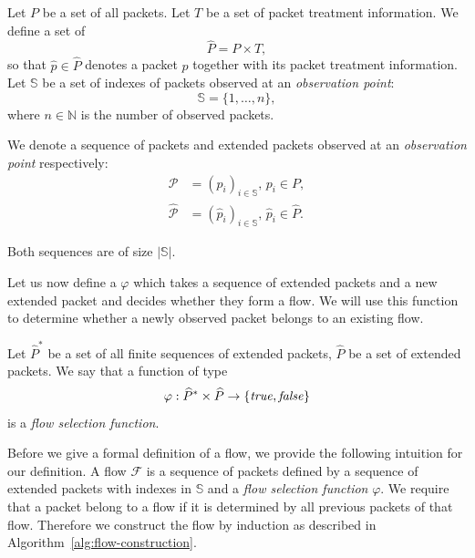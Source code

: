 \begin{defn}
Let $P$ be a set of all packets. Let $T$ be a set of packet treatment information. We define a set of 
\begin{equation*}
    \widehat{P} = P\times T,
\end{equation*}
so that $\widehat{p} \in \widehat{P}$ denotes a packet $p$ together with its packet treatment information. Let $\mathbb{S}$ be a set of indexes of packets observed at an \emph{observation point}:
\begin{equation*}
    \mathbb{S} = \{1, \ldots, n\}, %
\end{equation*}
where $n \in \mathbb{N}$ is the number of observed packets.%

We denote a sequence of packets and extended packets observed at an \emph{observation point} respectively:
\begin{align*}
    \mathcal{P} &= (p_i)_{i \in \mathbb{S}},\, p_i \in P,\\
    \widehat{\mathcal{P}} &= (\widehat{p}_i)_{i \in \mathbb{S}},\, \widehat{p}_i \in \widehat{P}.
\end{align*}
\end{defn}
Both sequences are of size $|\mathbb{S}|$. 

Let us now define a \emph{} $\varphi$ which takes a sequence of extended packets and a new extended packet and decides whether they form a flow. We will use this function to determine whether a newly observed packet belongs to an existing flow.
\begin{defn}\label{def:flow-selection-function}
Let $\widehat{P}^*$ be a set of all finite sequences of extended packets, $\widehat{P}$ be a set of extended packets. We say that a function of type
\begin{equation*}
    \varphi: \widehat{P}^*\times \widehat{P} \to \{\mathit{true,false}\}
\end{equation*}
is a \emph{flow selection function}.
\end{defn}

Before we give a formal definition of a flow, we provide the following intuition for our definition. A flow $\mathcal{F}$ is a sequence of packets defined by a sequence of extended packets with indexes in $\mathbb{S}$ and a \emph{flow selection function} $\varphi$. We require that a packet belong to a flow if it is determined by all previous packets of that flow. Therefore we construct the flow by induction as described in Algorithm~\ref{alg:flow-construction}.

